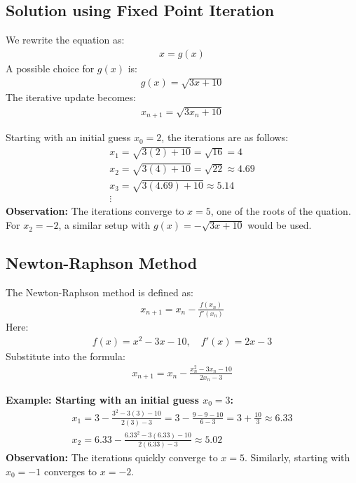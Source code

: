 \documentclass[journal]{IEEEtran}
\begin{document}
\subsection*{ Solution using Fixed Point Iteration}
We rewrite the equation as:
\begin{align}
    x = g(x)
\end{align}
A possible choice for \( g(x) \) is:
\begin{align}
    g(x) = \sqrt{3x + 10}
\end{align}
The iterative update becomes:
\begin{align}
    x_{n+1} = \sqrt{3x_n + 10}
\end{align}

Starting with an initial guess \( x_0 = 2 \), the iterations are as follows:
\begin{align}
    x_1 = \sqrt{3(2) + 10} = \sqrt{16} = 4 \\
    x_2 = \sqrt{3(4) + 10} = \sqrt{22} \approx 4.69 \\
    x_3 = \sqrt{3(4.69) + 10} \approx 5.14 \\
    \vdots
\end{align}
\textbf{Observation:} The iterations converge to \( x = 5 \), one of the roots of the quation. For \( x_2 = -2 \), a similar setup with \( g(x) = -\sqrt{3x + 10} \) would be used.

\subsection*{ Newton-Raphson Method}
The Newton-Raphson method is defined as:
\begin{align}
    x_{n+1} = x_n - \frac{f(x_n)}{f'(x_n)}
\end{align}
Here:
\begin{align}
    f(x) = x^2 - 3x - 10, \quad f'(x) = 2x - 3
\end{align}
Substitute into the formula:
\begin{align}
    x_{n+1} = x_n - \frac{x_n^2 - 3x_n - 10}{2x_n - 3}
\end{align}

\textbf{Example: Starting with an initial guess \( x_0 = 3 \):}
\begin{align}
    x_1 = 3 - \frac{3^2 - 3(3) - 10}{2(3) - 3} = 3 - \frac{9 - 9 - 10}{6 - 3} = 3 + \frac{10}{3} \approx 6.33 \\
    x_2 = 6.33 - \frac{6.33^2 - 3(6.33) - 10}{2(6.33) - 3} \approx 5.02
\end{align}
\textbf{Observation:} The iterations quickly converge to \( x = 5 \). Similarly, starting with \( x_0 = -1 \) converges to \( x = -2 \).
\end{document}
